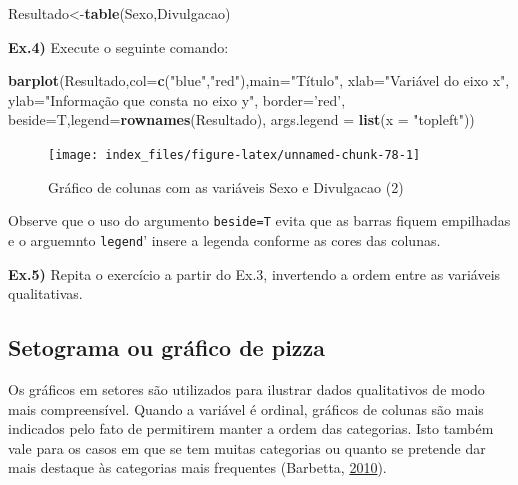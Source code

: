 \documentclass[12pt,brazil,oneside]{book}
\newenvironment{Shaded}{\begin{snugshade}}{\end{snugshade}}
\newcommand{\DataTypeTok}[1]{\textcolor[rgb]{0.13,0.29,0.53}{#1}}
\newcommand{\KeywordTok}[1]{\textcolor[rgb]{0.13,0.29,0.53}{\textbf{#1}}}
\newcommand{\NormalTok}[1]{#1}
\newcommand{\StringTok}[1]{\textcolor[rgb]{0.31,0.60,0.02}{#1}}
\begin{document}
\begin{Shaded}
\begin{Highlighting}[]
\NormalTok{Resultado<-}\KeywordTok{table}\NormalTok{(Sexo,Divulgacao)}
\end{Highlighting}
\end{Shaded}

\textbf{Ex.4)} Execute o seguinte comando:

\begin{Shaded}
\begin{Highlighting}[]
\KeywordTok{barplot}\NormalTok{(Resultado,}\DataTypeTok{col=}\KeywordTok{c}\NormalTok{(}\StringTok{"blue"}\NormalTok{,}\StringTok{"red"}\NormalTok{),}\DataTypeTok{main=}\StringTok{"Título"}\NormalTok{,}
        \DataTypeTok{xlab=}\StringTok{"Variável do eixo x"}\NormalTok{,}
        \DataTypeTok{ylab=}\StringTok{"Informação que consta no eixo y"}\NormalTok{, }
        \DataTypeTok{border=}\StringTok{'red'}\NormalTok{, }
        \DataTypeTok{beside=}\NormalTok{T,}\DataTypeTok{legend=}\KeywordTok{rownames}\NormalTok{(Resultado),}
        \DataTypeTok{args.legend =} \KeywordTok{list}\NormalTok{(}\DataTypeTok{x =} \StringTok{"topleft"}\NormalTok{))}
\end{Highlighting}
\end{Shaded}

\begin{figure}[H]

{\centering \texttt{[image: index\_files/figure-latex/unnamed-chunk-78-1]} 

}

\caption{Gráfico de colunas com as variáveis Sexo e Divulgacao (2)}\label{fig:unnamed-chunk-78}
\end{figure}

Observe que o uso do argumento \texttt{beside=T} evita que as barras fiquem empilhadas e o arguemnto \texttt{legend}' insere a legenda conforme as cores das colunas.

\textbf{Ex.5)} Repita o exercício a partir do Ex.3, invertendo a ordem entre as variáveis qualitativas.

\hypertarget{setograma-ou-grafico-de-pizza}{%
\subsection{Setograma ou gráfico de pizza}\label{setograma-ou-grafico-de-pizza}}

Os gráficos em setores são utilizados para ilustrar dados qualitativos de modo mais compreensível. Quando a variável é ordinal, gráficos de colunas são mais indicados pelo fato de permitirem manter a ordem das categorias. Isto também vale para os casos em que se tem muitas categorias ou quanto se pretende dar mais destaque às categorias mais frequentes (Barbetta, \protect\hyperlink{ref-barbetta1988}{2010}).
\end{document}
